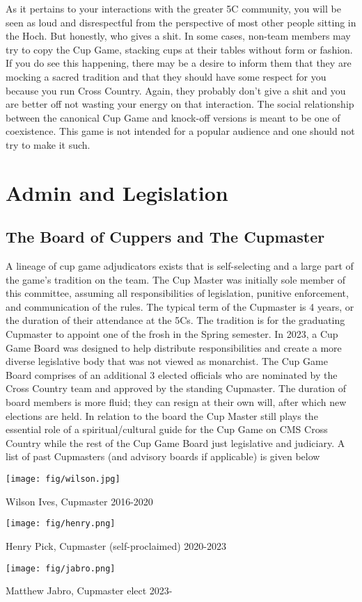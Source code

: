 \documentclass[12pt]{IEEEconf}
\begin{document}
As it pertains to your interactions with the greater 5C community, you will be seen as loud and disrespectful from the perspective of most other people sitting in the Hoch. But honestly, who gives a shit. In some cases, non-team members may try to copy the Cup Game, stacking cups at their tables without form or fashion. If you do see this happening, there may be a desire to inform them that they are mocking a sacred tradition and that they should have some respect for you because you run Cross Country. Again, they probably don't give a shit and you are better off not wasting your energy on that interaction. The social relationship between the canonical Cup Game and knock-off versions is meant to be one of coexistence. This game is not intended for a popular audience and one should not try to make it such.

\section{Admin and Legislation}
\subsection{The Board of Cuppers and The Cupmaster}
A lineage of cup game adjudicators exists that is self-selecting and a large part of the game's tradition on the team. The Cup Master was initially sole member of this committee, assuming all responsibilities of legislation, punitive enforcement, and communication of the rules. The typical term of the Cupmaster is 4 years, or the duration of their attendance at the 5Cs. The tradition is for the graduating Cupmaster to appoint one of the frosh in the Spring semester. In 2023, a Cup Game Board was designed to help distribute responsibilities and create a more diverse legislative body that was not viewed as monarchist. The Cup Game Board comprises of an additional 3 elected officials who are nominated by the Cross Country team and approved by the standing Cupmaster. The duration of board members is more fluid; they can resign at their own will, after which new elections are held. In relation to the board the Cup Master still plays the essential role of a spiritual/cultural guide for the Cup Game on CMS Cross Country while the rest of the Cup Game Board just legislative and judiciary. A list of past Cupmasters (and advisory boards if  applicable) is given below
\begin{center}
    \texttt{[image: fig/wilson.jpg]}

    Wilson Ives, Cupmaster 2016-2020

    \texttt{[image: fig/henry.png]}

    Henry Pick, Cupmaster (self-proclaimed) 2020-2023

    \texttt{[image: fig/jabro.png]}

    Matthew Jabro, Cupmaster elect 2023-
\end{center}
\end{document}

